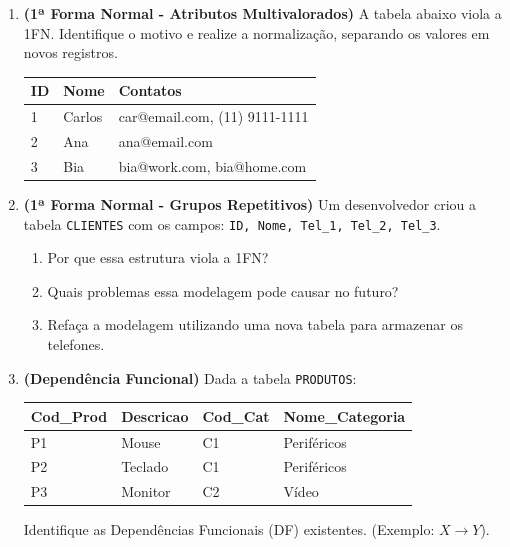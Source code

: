 \documentclass[12pt]{article}
\begin{document}
\begin{enumerate}[label=\textbf{Questão \arabic*:}, leftmargin=*]
    \item \textbf{(1ª Forma Normal - Atributos Multivalorados)} A tabela abaixo viola a 1FN. Identifique o motivo e realize a normalização, separando os valores em novos registros.
    
    \vspace{0.2cm}
    \centering
    \begin{tabular}{|l|l|l|}
        \hline
        \textbf{ID} & \textbf{Nome} & \textbf{Contatos} \\ \hline
        1 & Carlos & car@email.com, (11) 9111-1111 \\ \hline
        2 & Ana & ana@email.com \\ \hline
        3 & Bia & bia@work.com, bia@home.com \\ \hline
    \end{tabular}
    \flushleft

    \item \textbf{(1ª Forma Normal - Grupos Repetitivos)} Um desenvolvedor criou a tabela \texttt{CLIENTES} com os campos: \texttt{ID, Nome, Tel\_1, Tel\_2, Tel\_3}.
    \begin{enumerate}[label=\alph*)]
        \item Por que essa estrutura viola a 1FN?
        \item Quais problemas essa modelagem pode causar no futuro?
        \item Refaça a modelagem utilizando uma nova tabela para armazenar os telefones.
    \end{enumerate}

    \item \textbf{(Dependência Funcional)} Dada a tabela \texttt{PRODUTOS}:
    
    \vspace{0.2cm}
    \centering
    \begin{tabular}{|l|l|l|l|}
        \hline
        \textbf{Cod\_Prod} & \textbf{Descricao} & \textbf{Cod\_Cat} & \textbf{Nome\_Categoria} \\ \hline
        P1 & Mouse & C1 & Periféricos \\ \hline
        P2 & Teclado & C1 & Periféricos \\ \hline
        P3 & Monitor & C2 & Vídeo \\ \hline
    \end{tabular}
    \flushleft
    \vspace{0.2cm}
    Identifique as Dependências Funcionais (DF) existentes. (Exemplo: $X \to Y$).


\end{enumerate}
\end{document}
